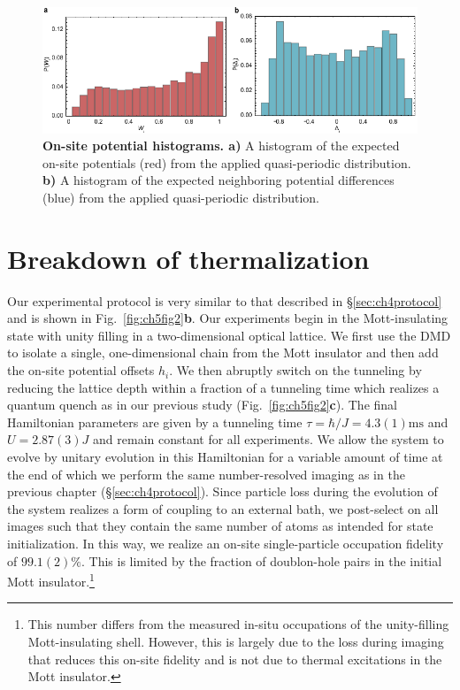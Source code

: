 \begin{figure}[t!]
		\includegraphics[width=\columnwidth]{figures/ch5/MBL_dists_combo.pdf} 
		\caption{\textbf{On-site potential histograms. a)} A histogram of the expected on-site potentials (red) from the applied quasi-periodic distribution. \textbf{b)} A histogram of the expected neighboring potential differences (blue) from the applied quasi-periodic distribution.}
		\label{fig:disHist}	
\end{figure}

\section{Breakdown of thermalization}

Our experimental protocol is very similar to that described in \S \ref{sec:ch4protocol} and is shown in Fig.~\ref{fig:ch5fig2}\textbf{b}. Our experiments begin in the Mott-insulating state with unity filling in a two-dimensional optical lattice. We first use the DMD to isolate a single, one-dimensional chain from the Mott insulator and then add the on-site potential offsets $h_i$. We then abruptly switch on the tunneling by reducing the lattice depth within a fraction of a tunneling time which realizes a quantum quench as in our previous study (Fig.~\ref{fig:ch5fig2}\textbf{c}). The final Hamiltonian parameters are given by a tunneling time $\tau=\hbar/J=4.3(1)\mathrm{ms}$ and $U = 2.87(3)J$ and remain constant for all experiments. We allow the system to evolve by unitary evolution in this Hamiltonian for a variable amount of time at the end of which we perform the same number-resolved imaging as in the previous chapter (\S \ref{sec:ch4protocol}). Since particle loss during the evolution of the system realizes a form of coupling to an external bath, we post-select on all images such that they contain the same number of atoms as intended for state initialization. In this way, we realize an on-site single-particle occupation fidelity of $99.1(2)\%$. This is limited by the fraction of doublon-hole pairs in the initial Mott insulator.\footnote{This number differs from the measured in-situ occupations of the unity-filling Mott-insulating shell. However, this is largely due to the loss during imaging that reduces this on-site fidelity and is not due to thermal excitations in the Mott insulator.} 

